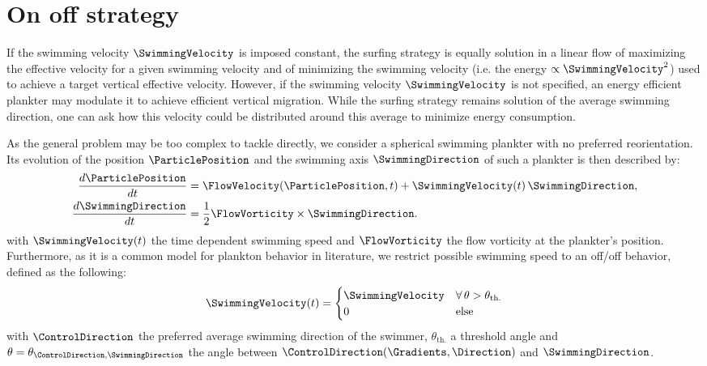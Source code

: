 \section{On off strategy}

If the swimming velocity $\SwimmingVelocity$ is imposed constant, the surfing strategy is equally solution in a linear flow of maximizing the effective velocity for a given swimming velocity and of minimizing the swimming velocity (i.e. the energy $\propto \SwimmingVelocity^2$) used to achieve a target vertical effective velocity.
However, if the swimming velocity $\SwimmingVelocity$ is not specified, an energy efficient plankter may modulate it to achieve efficient vertical migration. 
While the surfing strategy remains solution of the average swimming direction, one can ask how this velocity could be distributed around this average to minimize energy consumption.

As the general problem may be too complex to tackle directly, we consider a spherical swimming plankter with no preferred reorientation.
Its evolution of the position $\ParticlePosition$ and the swimming axis $\SwimmingDirection$ of such a plankter is then described by:
\begin{subequations}\label{eq:spherical_motion}
	\begin{align}
		\frac{d \ParticlePosition}{dt} & =
		 \FlowVelocity (\ParticlePosition, t) + \SwimmingVelocity(t) \, \SwimmingDirection, \label{eq:surfing_x_motion}\\
		\frac{d \SwimmingDirection}{dt} & = \frac{1}{2} \FlowVorticity \times \SwimmingDirection .\label{eq:vorticity_p_motion}
	\end{align}
\end{subequations}
with $\SwimmingVelocity(t)$ the time dependent swimming speed and $\FlowVorticity$ the flow vorticity at the plankter's position.
Furthermore, as it is a common model for plankton behavior in literature, we restrict possible swimming speed to an off/off behavior, defined as the following:
\begin{equation}
	\SwimmingVelocity(t) =
	\begin{cases}
		\SwimmingVelocity & \forall \, \theta > \theta_{\mathrm{th.}} \\
		0 & \mathrm{else}
	\end{cases}
\end{equation}
with $\ControlDirection$ the preferred average swimming direction of the swimmer, $\theta_{\mathrm{th.}}$ a threshold angle and $\theta = \theta_{\ControlDirection, \SwimmingDirection}$ the angle between $\ControlDirection(\Gradients, \Direction)$ and $\SwimmingDirection$.

